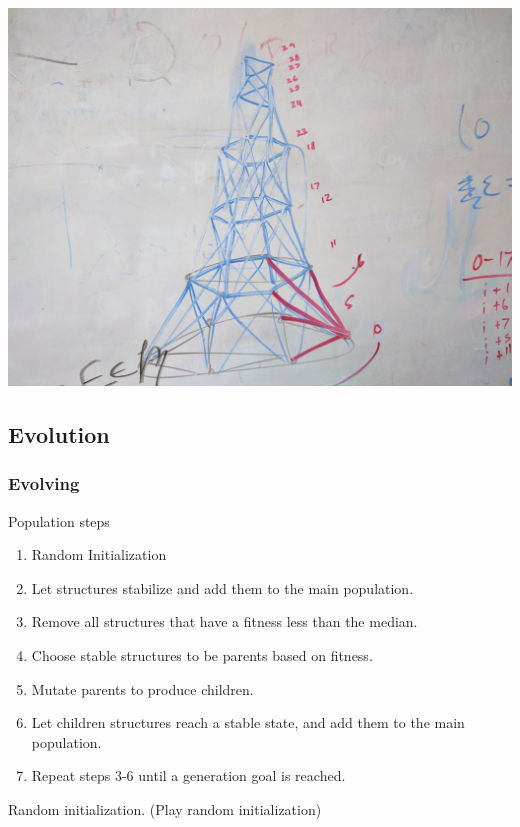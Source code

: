 \documentclass[xcolor=dvipsnames]{beamer}
\begin{document}
\begin{frame}
\begin{center}
\includegraphics[scale = 0.060]{artTower.jpg}
\end{center}
\end{frame}

\begin{frame}
\section{Evolution}
\frametitle{Evolving}

Population steps
\begin{enumerate}[1]
\item Random Initialization
\item Let structures stabilize and add them to the main population.
\item Remove all structures that have a fitness less than the median.
\item Choose stable structures to be parents based on fitness.
\item Mutate parents to produce children.
\item Let children structures reach a stable state, and add them to the main population.
\item Repeat steps 3-6 until a generation goal is reached.
\end{enumerate}
\end{frame}

\begin{frame}

Random initialization.
(Play random initialization)

\end{frame}
\end{document}
